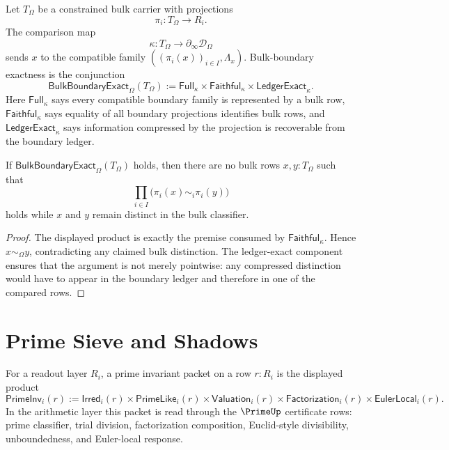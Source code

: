 \begin{definition}
\label{def:rh-bulk-boundary-exactness}
Let $T_{\Omega}$ be a constrained bulk carrier with projections
$$
\pi_i:T_{\Omega}\to R_i.
$$
The comparison map
$$
\kappa:T_{\Omega}\to\partial_{\infty}\mathcal D_{\Omega}
$$
sends $x$ to the compatible family $((\pi_i(x))_{i\in I},\Lambda_x)$.
Bulk-boundary exactness is the conjunction
$$
\mathsf{BulkBoundaryExact}_{\Omega}(T_{\Omega})
:=
\mathsf{Full}_{\kappa}
\times
\mathsf{Faithful}_{\kappa}
\times
\mathsf{LedgerExact}_{\kappa}.
$$
Here $\mathsf{Full}_{\kappa}$ says every compatible boundary family is
represented by a bulk row, $\mathsf{Faithful}_{\kappa}$ says equality of
all boundary projections identifies bulk rows, and
$\mathsf{LedgerExact}_{\kappa}$ says information compressed by the
projection is recoverable from the boundary ledger.
\end{definition}

\begin{theorem}
\label{thm:rh-bulk-boundary-exactness-excludes-ghost-bulk}
If $\mathsf{BulkBoundaryExact}_{\Omega}(T_{\Omega})$ holds, then there are
no bulk rows $x,y:T_{\Omega}$ such that
$$
\prod_{i\in I}\bigl(\pi_i(x)\sim_i\pi_i(y)\bigr)
$$
holds while $x$ and $y$ remain distinct in the bulk classifier.
\end{theorem}

\begin{proof}
The displayed product is exactly the premise consumed by
$\mathsf{Faithful}_{\kappa}$. Hence $x\sim_{\Omega}y$, contradicting any
claimed bulk distinction. The ledger-exact component ensures that the
argument is not merely pointwise: any compressed distinction would have to
appear in the boundary ledger and therefore in one of the compared rows.
\end{proof}

\section{Prime Sieve and Shadows}
\label{sec:rh-prime-sieve-shadows}

\begin{definition}
\label{def:rh-prime-invariant-packet}
For a readout layer $R_i$, a prime invariant packet on a row $r:R_i$ is
the displayed product
$$
\mathsf{PrimeInv}_i(r)
:=
\mathsf{Irred}_i(r)
\times
\mathsf{PrimeLike}_i(r)
\times
\mathsf{Valuation}_i(r)
\times
\mathsf{Factorization}_i(r)
\times
\mathsf{EulerLocal}_i(r).
$$
In the arithmetic layer this packet is read through the $\PrimeUp$
certificate rows: prime classifier, trial division, factorization
composition, Euclid-style divisibility, unboundedness, and Euler-local
response.
\end{definition}


